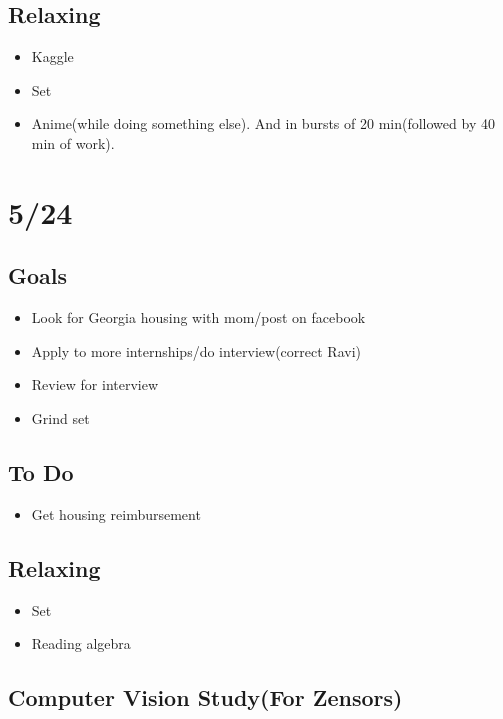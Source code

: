 \documentclass[11pt]{article}
\theoremstyle{remark}
\begin{document}
\subsection{Relaxing}

\begin{itemize}
	\item Kaggle
	\item Set
	\item Anime(while doing something else). And in bursts of 20 min(followed by 40 min of work).
\end{itemize}



\section{5/24}

\subsection{Goals}

\begin{itemize}
	\item Look for Georgia housing with mom/post on facebook
	\item Apply to more internships/do interview(correct Ravi)
	\item Review for interview
	\item Grind set
\end{itemize}

\subsection{To Do}

\begin{itemize}
	\item Get housing reimbursement
\end{itemize}

\subsection{Relaxing}

\begin{itemize}
	\item Set
	\item Reading algebra
\end{itemize}

\subsection{Computer Vision Study(For Zensors)}
\end{document}
